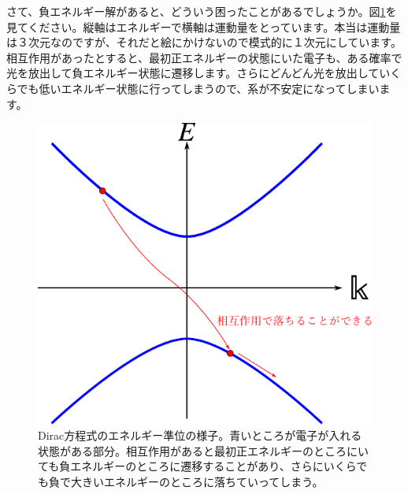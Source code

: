 \documentclass[report,paper=a4, fontsize=12pt, line_length=16cm, number_of_lines=33,dvipdfmx]{jlreq}
\numberwithin{equation}{chapter}
\begin{document}
さて、負エネルギー解があると、どういう困ったことがあるでしょうか。図\ref{fig:negative_energy}を見てください。縦軸はエネルギーで横軸は運動量をとっています。本当は運動量は３次元なのですが、それだと絵にかけないので模式的に１次元にしています。相互作用があったとすると、最初正エネルギーの状態にいた電子も、ある確率で光を放出して負エネルギー状態に遷移します。さらにどんどん光を放出していくらでも低いエネルギー状態に行ってしまうので、系が不安定になってしまいます。
\begin{figure}[htbp]
  \centering
  \includegraphics{negative_energy.pdf}
  \caption{Dirac方程式のエネルギー準位の様子。青いところが電子が入れる状態がある部分。相互作用があると最初正エネルギーのところにいても負エネルギーのところに遷移することがあり、さらにいくらでも負で大きいエネルギーのところに落ちていってしまう。}
  \label{fig:negative_energy}
\end{figure}
\end{document}
